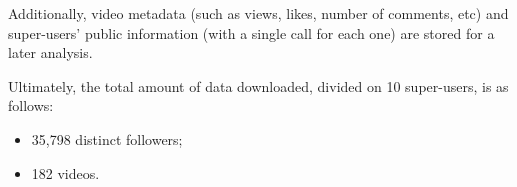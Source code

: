 Additionally, video metadata (such as views, likes, number of comments, etc) and super-users' public information (with a single call for each one) are stored for a later analysis. 

Ultimately, the total amount of data downloaded, divided on 10 super-users, is as follows:
\begin{itemize}
    \item 35,798 distinct followers;
    \item 182 videos.
\end{itemize}